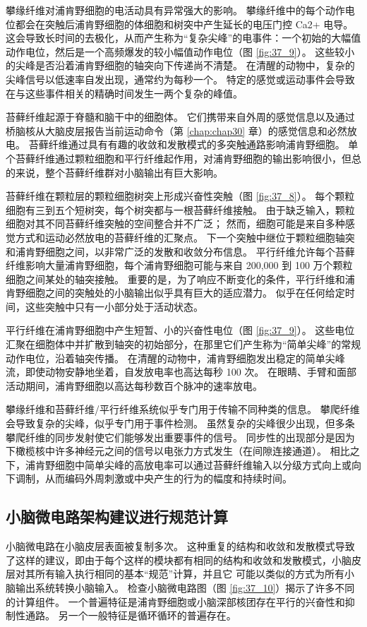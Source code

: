 攀缘纤维对浦肯野细胞的电活动具有异常强大的影响。 攀缘纤维中的每个动作电位都会在突触后浦肯野细胞的体细胞和树突中产生延长的电压门控 Ca2+ 电导。 这会导致长时间的去极化，从而产生称为“复杂尖峰”的电事件：一个初始的大幅值动作电位，然后是一个高频爆发的较小幅值动作电位（图 \ref{fig:37_9}）。 这些较小的尖峰是否沿着浦肯野细胞的轴突向下传递尚不清楚。 在清醒的动物中，复杂的尖峰信号以低速率自发出现，通常约为每秒一个。 特定的感觉或运动事件会导致在与这些事件相关的精确时间发生一两个复杂的峰值。

苔藓纤维起源于脊髓和脑干中的细胞体。 它们携带来自外周的感觉信息以及通过桥脑核从大脑皮层报告当前运动命令（第 \ref{chap:chap30} 章）的感觉信息和必然放电。 苔藓纤维通过具有有趣的收敛和发散模式的多突触通路影响浦肯野细胞。 单个苔藓纤维通过颗粒细胞和平行纤维起作用，对浦肯野细胞的输出影响很小，但总的来说，整个苔藓纤维群对小脑输出有巨大影响。

苔藓纤维在颗粒层的颗粒细胞树突上形成兴奋性突触（图 \ref{fig:37_8}）。 每个颗粒细胞有三到五个短树突，每个树突都与一根苔藓纤维接触。 由于缺乏输入，颗粒细胞对其不同苔藓纤维突触的空间整合并不广泛； 然而，细胞可能是来自多种感觉方式和运动必然放电的苔藓纤维的汇聚点。 下一个突触中继位于颗粒细胞轴突和浦肯野细胞之间，以非常广泛的发散和收敛分布信息。 平行纤维允许每个苔藓纤维影响大量浦肯野细胞，每个浦肯野细胞可能与来自 200,000 到 100 万个颗粒细胞之间某处的轴突接触。 重要的是，为了响应不断变化的条件，平行纤维和浦肯野细胞之间的突触处的小脑输出似乎具有巨大的适应潜力。 似乎在任何给定时间，这些突触中只有一小部分处于活动状态。

平行纤维在浦肯野细胞中产生短暂、小的兴奋性电位（图 \ref{fig:37_9}）。 这些电位汇聚在细胞体中并扩散到轴突的初始部分，在那里它们产生称为“简单尖峰”的常规动作电位，沿着轴突传播。 在清醒的动物中，浦肯野细胞发出稳定的简单尖峰流，即使动物安静地坐着，自发放电率也高达每秒 100 次。 在眼睛、手臂和面部活动期间，浦肯野细胞以高达每秒数百个脉冲的速率放电。

攀缘纤维和苔藓纤维/平行纤维系统似乎专门用于传输不同种类的信息。 攀爬纤维会导致复杂的尖峰，似乎专门用于事件检测。 虽然复杂的尖峰很少出现，但多条攀爬纤维的同步发射使它们能够发出重要事件的信号。 同步性的出现部分是因为下橄榄核中许多神经元之间的信号以电张力方式发生（在间隙连接通道）。 相比之下，浦肯野细胞中简单尖峰的高放电率可以通过苔藓纤维输入以分级方式向上或向下调制，从而编码外周刺激或中央产生的行为的幅度和持续时间。

\subsection{小脑微电路架构建议进行规范计算}
小脑微电路在小脑皮层表面被复制多次。 这种重复的结构和收敛和发散模式导致了这样的建议，即由于每个这样的模块都有相同的结构和收敛和发散模式，小脑皮层对其所有输入执行相同的基本“规范”计算，并且它 可能以类似的方式为所有小脑输出系统转换小脑输入。 
检查小脑微电路图（图 \ref{fig:37_10}）揭示了许多不同的计算组件。 
一个普遍特征是浦肯野细胞或小脑深部核团存在平行的兴奋性和抑制性通路。 另一个一般特征是循环循环的普遍存在。



